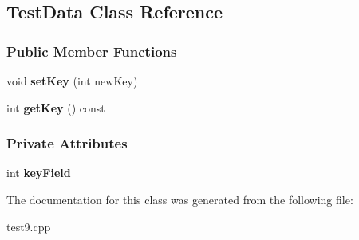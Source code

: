 \hypertarget{class_test_data}{}\subsection{Test\+Data Class Reference}
\label{class_test_data}
\subsubsection*{Public Member Functions}
\begin{DoxyCompactItemize}
\item 
void {\bfseries set\+Key} (int new\+Key)\hypertarget{class_test_data_a609b8a4b0e3221bfb0b8cbd9efb108a7}{}\label{class_test_data_a609b8a4b0e3221bfb0b8cbd9efb108a7}

\item 
int {\bfseries get\+Key} () const \hypertarget{class_test_data_a85ac27a4361a78d576dd8c10b1f97961}{}\label{class_test_data_a85ac27a4361a78d576dd8c10b1f97961}

\end{DoxyCompactItemize}
\subsubsection*{Private Attributes}
\begin{DoxyCompactItemize}
\item 
int {\bfseries key\+Field}\hypertarget{class_test_data_adafb60a315eaa088791c9e40f4a2618f}{}\label{class_test_data_adafb60a315eaa088791c9e40f4a2618f}

\end{DoxyCompactItemize}


The documentation for this class was generated from the following file\+:\begin{DoxyCompactItemize}
\item 
test9.\+cpp\end{DoxyCompactItemize}
